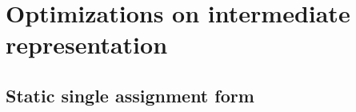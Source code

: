 \chapter{Optimizations on intermediate representation}

\section{Static single assignment form}

\cite{Muchnick:1998:ACD:286076}
